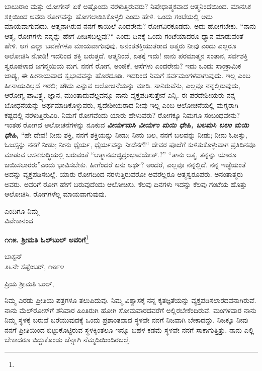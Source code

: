 ಬಾಬುರಾಂ ಮತ್ತು ಯೋಗೇನ್ ಏಕೆ ಅಷ್ಟೊಂದು ನರಳುತ್ತಿರುವರು? ನಿಷೇಧಾತ್ಮಕವಾದ ಆತ್ಮನಿಂದೆಯಿಂದ. ಮಾನಸಿಕ ಶಕ್ತಿಯಿಂದ ಅವರು ರೋಗವನ್ನು ಹೋಗಲಾಡಿಸಿಕೊಳ್ಳಲಿ ಎಂದು ಹೇಳಿ. ಒಂದು ಗಂಟೆಯಲ್ಲಿ ಅದು ಮಾಯವಾಗುವುದು. ಆತ್ಮನಾಗಿರುವ ನನಗೆ ಕಾಯಿಲೆ ಎಂದರೇನು? ರೋಗವಿರಕೂಡದು. ಅದು ಹೋಗಬೇಕು. “ನಾನು ಆತ್ಮ, ರೋಗಗಳು ನನ್ನನ್ನು ಹೇಗೆ ಪೀಡಿಸಬಲ್ಲವು?“ ಎಂದು ದಿನಕ್ಕೆ ಒಂದು ಗಂಟೆಯಾದರೂ ಧ್ಯಾನ ಮಾಡುವಂತೆ ಹೇಳಿ. ಆಗ ಎಲ್ಲಾ ಬವಣೆಗಳೂ ಮಾಯವಾಗುವುವು. ಅನಂತಶಕ್ತಿಯುತರಾದ ಆತ್ಮರು ನೀವು ಎಂದು ಎಲ್ಲರೂ ಆಲೋಚಿಸಿ ನೋಡಿ! ಇದರಿಂದ ಶಕ್ತಿ ಬರುತ್ತದೆ. ಆತ್ಮನಿಂದೆ, ಏತಕ್ಕೆ ಇದು! ನಾನು ಪರಮಾತ್ಮನ ಸಂತಾನ, ಸರ್ವಶಕ್ತಿ ಸ್ವರೂಪಳಾದ ಜಗನ್ಮಯಿಯ ಮಗ. ನನಗೆ ರೋಗ, ಅಂಜಿಕೆ, ಆಸೆಗಳು ಎಂದರೇನು? ಇದು ಒಂದು ಸಾಂಕ್ರಾಮಿಕ ಜಾಡ್ಯ, ಈ ಹೀನಾಯವಾದ ಸ್ವಭಾವವನ್ನು ಹೊರದೂಡಿ. ಇದರಿಂದ ನಿಮಗೆ ಸರ್ವಮಂಗಳವಾಗುವುದು. ಇಲ್ಲ ಎಂಬ ಹೀನಾಯವಿಲ್ಲದೆ ಇರಲಿ; ಹೌದು ಎನ್ನುವ ಆಲೋಚನೆಯನ್ನು ಮಾಡಿ. ನಾನಿರುವೆನು, ಎಲ್ಲವೂ ನನ್ನಲ್ಲಿರುವುದು, ಆರೋಗ್ಯ ಪಾವಿತ್ರ್ಯ, ಜ್ಞಾನ, ಮುಂತಾದುವೆಲ್ಲವನ್ನೂ ನಾನು ವ್ಯಕ್ತಪಡಿಸುತ್ತೇನೆ ಎನ್ನಿ. ಈ ಪರದೇಶೀಯರು ನನ್ನ ಬೋಧನೆಯನ್ನು ಅರ್ಥಮಾಡಿಕೊಳ್ಳುವರು, ಸ್ವದೇಶೀಯರಾದ ನೀವು ಇಲ್ಲ ಎಂಬ ಆಲೋಚನೆಯಲ್ಲಿ ಮಗ್ನರಾಗಿ ಕಷ್ಟದಲ್ಲಿ ನರಳುತ್ತಿರುವಿರಿ. ನಿಮಗೆ ರೋಗವೆಂದು ಯಾರು ಹೇಳುವರು? ರೋಗಕ್ಕೂ ನಿಮಗೂ ಸಂಬಂಧವೇನು? ಇಂತಹ ರೋಗದ ಆಲೋಚನೆಗಳನ್ನು ನೂಕುವ\enginline{-} \textbf{\textit{ವೀರ್ಯಮಸಿ ವೀರ್ಯಂ ಮಯಿ ಧೇಹಿ, ಬಲಮಸಿ ಬಲಂ ಮಯಿ ಧೇಹಿ, }} “ಹೇ ದೇವ! ನೀನು ಶಕ್ತಿ, ನನಗೆ ಶಕ್ತಿಯನ್ನು ನೀಡು; ನೀನು ಬಲ, ನನಗೆ ಬಲವನ್ನು ನೀಡು; ನೀನು ಓಜಸ್ಸು, ಓಜಸ್ಸನ್ನು ನನಗೆ ನೀಡು; ನೀನು ಧೈರ್ಯ, ಧೈರ್ಯವನ್ನು ನೀಡೆನಗೆ!“ ದೇವರ ಪೂಜೆಗೆ ಕುಳಿತುಕೊಳ್ಳುವಾಗ ಪ್ರತಿದಿನವೂ ಮಾಡುವ ಆಸನಶುದ್ಧಿಯಲ್ಲಿ ಬರುವಂತೆ “ಆತ್ಮಾನಮಚ್ಛಿದ್ರಂಭಾವಯೇತ್.?” “ತಾನು ಆತ್ಮ, ತನ್ನನ್ನು ಯಾರೂ ಜಯಿಸಲಾರರು”ಎಂದು ಭಾವಿಸಬೇಕು. ಹೀಗೆಂದರೆ ಏನು ಅರ್ಥ? ಅಂದರೆ, ಎಲ್ಲವೂ ನನ್ನಲ್ಲಿದೆ. ನನ್ನ ಇಚ್ಛೆಯಂತೆ ಅದನ್ನು ವ್ಯಕ್ತಪಡಿಸಬಲ್ಲೆ. ಯಾರು ರೋಗದಿಂದ ನರಳುತ್ತಿರುವರೋ ಅವರೆಲ್ಲರೂ ಆತ್ಮಸ್ವರೂಪರು. ಅನಂತಾತ್ಮರು ಅವರು. ಅವರಿಗೆ ರೋಗ ಹೇಗೆ ಬರುವುದೆಂದು ಆಲೋಚಿಸು. ಕೆಲವು ದಿನಗಳು ಇದನ್ನು ಕೆಲವು ಗಂಟೆಯ ಹೊತ್ತು ಆಲೋಚಿಸಿ. ರೋಗಗಳೆಲ್ಲ ಮಾಯವಾಗುವುವು.

{\flushright
ಎಂದಿಗೂ ನಿಮ್ಮ\\ವಿವೇಕಾನಂದ\par}

\newpage

\begin{center}
\textbf{೧೧೫. ಶ‍್ರೀಮತಿ ಓಲ್‌ಬುಲ್‌ ಅವರಿಗೆ}\footnote{}
\end{center}

\begin{flushright}
ಬಾಸ್ಟನ್\\೨೬ನೇ ಸೆಪ್ಟೆಂಬರ್, ೧೮೯೪
\end{flushright}

\noindent
ಪ್ರಿಯ ಶ‍್ರೀಮತಿ ಬುಲ್,

ನಿಮ್ಮ ಎರಡು ಪ್ರೀತಿಯ ಪತ್ರಗಳೂ ತಲುಪಿದುವು. ನಿಮ್ಮ ವಿಶ್ವಾಸಕ್ಕೆ ನನ್ನ ಕೃತಜ್ಞತೆಯನ್ನು ವ್ಯಕ್ತಪಡಿಸಲಾರದವನಾಗಿರುವೆ. ನಾನು ಮೆಲ್‌ರೋಸ್‌ಗೆ ಶನಿವಾರ ಹಿಂತಿರುಗಿ ಹೋಗಿ ಸೋಮವಾರದವರೆಗೆ ಅಲ್ಲಿರಬೇಕೆಂದಿರುವೆ. ಮಂಗಳವಾರ ನಾನು ನಿಮ್ಮ ಸ್ಥಳಕ್ಕೆ ಬರುವೆ\enginline{-} ಬರೆಯುವುದಕ್ಕೆ ಒಂದು ಪ್ರಶಾಂತವಾದ ಸ್ಥಳವೇ ನನಗೆ ನಿಜವಾಗಿ ಬೇಕಾದದ್ದು. ನಿಜಕ್ಕೂ ನೀವು ನನಗೆ ಪ್ರೀತಿಯಿಂದ ಬಿಟ್ಟುಕೊಟ್ಟಿರುವ ಸ್ಥಳಕ್ಕಿಂತಲೂ ಇನ್ನೂ ಬಹಳ ಕಡಮೆ ಸ್ಥಳವೇ ನನಗೆ ಸಾಕಾಗುತ್ತಿತ್ತು. ನಾನು ಎಲ್ಲಿ ಬೇಕಾದರೂ ಬಿದ್ದುಕೊಂಡು ಚೆನ್ನಾಗಿ ನೆಮ್ಮದಿಯಿಂದಿರಬಲ್ಲೆ.

